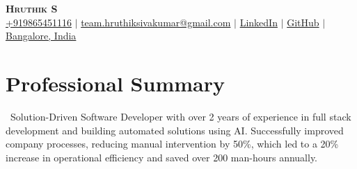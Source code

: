 \documentclass[letterpaper,11pt]{article}
\begin{document}

\begin{center}
    \textbf{\Huge \scshape Hruthik S} \\ \vspace{3pt}
    \small
    \faMobile \hspace{.5pt} \href{tel:+919865451116}{+919865451116}
    $|$
    \faAt \hspace{.5pt} \href{mailto:team.hruthiksivakumar@gmail.com}{team.hruthiksivakumar@gmail.com}
    $|$
    \faLinkedinSquare \hspace{.5pt} \href{https://www.linkedin.com/in/hruthiksivakumar/}{LinkedIn}
    $|$
    \faGithub \hspace{.5pt} \href{https://github.com/hruthiksiva}{GitHub}
    $|$
    \faMapMarker \hspace{.5pt} \href{https://www.google.com/maps/place/Bogazici+University+North+Campus/@41.0863067,29.0441352,15z/data=!4m5!3m4!1s0x0:0x9d2497b07c8edb2f!8m2!3d41.0863067!4d29.0441352}{Bangalore, India}
\end{center}


\section{Professional Summary}
    \vspace{3pt}
        \ Solution-Driven Software Developer with over 2 years of experience in full stack development and building automated solutions using AI. Successfully improved company processes, reducing manual intervention by 50\%, which led to a 20\% increase in operational efficiency and saved over 200 man-hours annually. 




\end{document}
